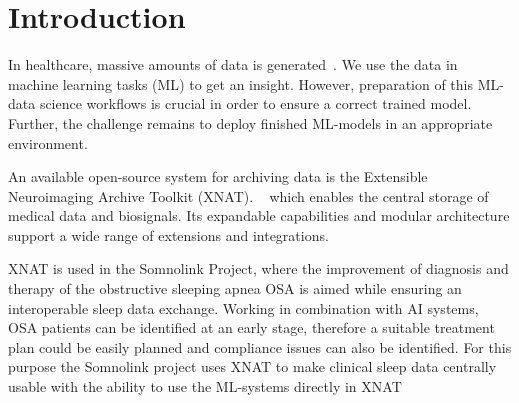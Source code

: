 
\chapter{Introduction}
\begin{comment}
test222
\end{comment}
 In healthcare, massive amounts of data is generated~\cite{https://doi.org/10.1038/s41591-019-0727-5}. We use the data in machine learning tasks (\ac{ML}) to get an insight. However, preparation of this ML-data science workflows is crucial in order to ensure a correct trained model. Further, the challenge remains to deploy finished ML-models in an appropriate environment.

 \begin{comment}
      All over the world the clinical data, is a part of the surrounding area of so called Health data. It is assembled and archived as a patients files or other formats. Thus far, this data has not been used for medical Research, or just to a very minor extent. Storing this data in one place and analyzing it promises great potential for biomedical discoveries. Studies by Jensen et al. (2012) and Rumsfeld et al. (2016) have shown that, despite its richness, clinical data is often stored in fragmented systems and used for research only sparingly.~\cite{jensen_mining_2012} ~\cite{rumsfeld_big_2016} Shah(2012) underlined that analyzing this data base could accelerate biomedical discoveries \cite{shah_coming_2012}.
 \end{comment}



An available open-source system for archiving data is the Extensible Neuroimaging Archive Toolkit (XNAT). ~\cite{marcus_extensible_2007} which enables the central storage of medical data and biosignals. Its expandable capabilities and modular architecture support a wide range of extensions and integrations. 

XNAT is used in the Somnolink Project, where the improvement of diagnosis and therapy of the obstructive sleeping apnea \ac{OSA} is aimed while ensuring an interoperable sleep data exchange. Working in combination with \ac{AI} systems, OSA patients can be identified at an early stage, therefore a suitable treatment plan could be easily planned and compliance issues can also be identified. For this purpose the Somnolink project uses XNAT to make clinical sleep data centrally usable with the ability to use the ML-systems directly in XNAT~\cite{internetredaktion_somnolink_nodate}   


